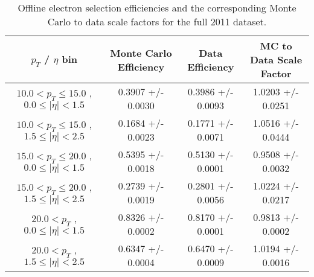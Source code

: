  \begin{table}[!ht]
 \begin{center} 
 \begin{tabular}{|c|c|c|c|}
 \hline
 $p_{T}$ / $\eta$ bin    &  Monte Carlo Efficiency    &  Data Efficiency   &  MC to Data Scale Factor \\   \hline           
$ 10.0 < p_{T} \le  15.0$ , $  0.0  \le |\eta| <   1.5$   &       0.3907 +/- 0.0030   &       0.3986 +/- 0.0093   &       1.0203 +/- 0.0251   \\   
\hline
$ 10.0 < p_{T} \le  15.0$ , $  1.5  \le |\eta| <   2.5$   &       0.1684 +/- 0.0023   &       0.1771 +/- 0.0071   &       1.0516 +/- 0.0444   \\   
\hline
$ 15.0 < p_{T} \le  20.0$ , $  0.0  \le |\eta| <   1.5$   &       0.5395 +/- 0.0018   &       0.5130 +/- 0.0001   &       0.9508 +/- 0.0032   \\   
\hline
$ 15.0 < p_{T} \le  20.0$ , $  1.5  \le |\eta| <   2.5$   &       0.2739 +/- 0.0019   &       0.2801 +/- 0.0056   &       1.0224 +/- 0.0217   \\   
\hline
$ 20.0 < p_{T} $ , $  0.0  \le |\eta| <   1.5$   &       0.8326 +/- 0.0002   &       0.8170 +/- 0.0001   &       0.9813 +/- 0.0002   \\   
\hline
$ 20.0 < p_{T} $ , $  1.5  \le |\eta| <   2.5$   &       0.6347 +/- 0.0004   &       0.6470 +/- 0.0009   &       1.0194 +/- 0.0016   \\   
\hline
\end{tabular}
\caption{Offline electron selection efficiencies and the corresponding Monte Carlo to data scale factors for the
full 2011 dataset.}
\label{tab:eff_ele_offline_Full2011}
\end{center}
\end{table}
